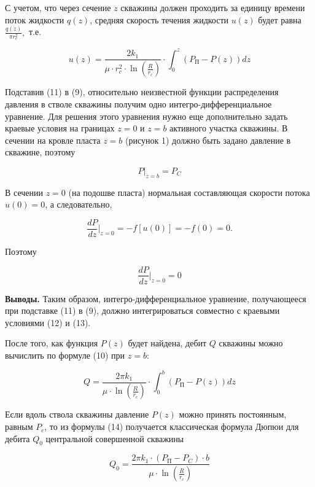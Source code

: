 \begin{multicols}{2}
С учетом, что через сечение $z$ скважины должен проходить за
единицу времени поток жидкости $q(z)$, средняя скорость течения
жидкости $u(z)$ будет равна $\frac{q(z)}{\pi r_c^2},$ т.е.

\begin{equation}
u(z)=\frac{2k_1}{\mu\cdot r_c^2\cdot\ln\left(\frac{R}{r_c}\right)}\cdot\int_0^z(P_{\text{П}}-P(z))dz
\end{equation}

Подставив (11) в (9), относительно неизвестной функции распределения
давления
в
стволе скважины получим одно интегро-дифференциальное уравнение. Для
решения этого уравнения нужно еще дополнительно задать краевые условия
на границах $z=0$ и $z=b$ активного участка скважины. В
сечении на кровле пласта $z=b$ (рисунок 1) должно быть задано
давление в скважине, поэтому

\begin{equation}
P|_{z=b}=P_C
\end{equation}

В сечении $z=0$ (на подошве пласта) нормальная составляющая
скорости потока $u(0)=0$, а следовательно,

\begin{equation*}
\frac{dP}{dz}|_{z=0}=-f[u(0)]=-f(0)=0.
\end{equation*}

Поэтому

\begin{equation}
\frac{dP}{dz}|_{z=0}=0
\end{equation}

{\bfseries Выводы.} Таким образом, интегро-дифферен\-циальное уравнение,
получающееся при подставке (11) в (9), должно интегрироваться совместно
с краевыми условиями (12) и (13).

После того, как функция $P(z)$ будет найдена, дебит $Q$ скважины
можно вычислить по формуле (10) при $z=b$:

\begin{equation}
Q=\frac{2\pi k_1}{\mu\cdot\ln\left(\frac{R}{r_c}\right)}\cdot\int_0^b(P_{\text{П}}-P(z))dz
\end{equation}

Если вдоль ствола скважины давление $P(z)$ можно принять постоянным,
равным $P_c$, то из формулы (14) получается классическая формула Дюпюи
для дебита $Q_0$ центральной совершенной скважины

\begin{equation}
Q_0=\frac{2\pi k_1\cdot (P_{\text{П}}-P_C)\cdot b}{\mu\cdot\ln\left(\frac{R}{r_c}\right)}
\end{equation}


\end{multicols}

